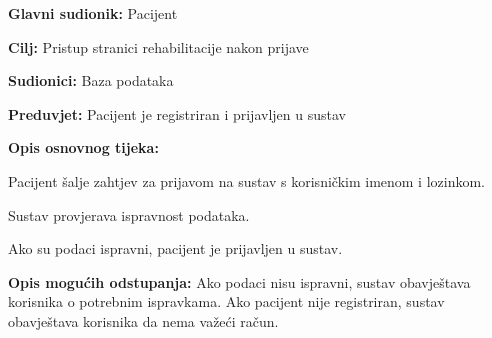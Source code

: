                     \noindent {}
					\begin{packed_item}
	
						\item \textbf{Glavni sudionik: }Pacijent
						\item  \textbf{Cilj:} Pristup stranici rehabilitacije nakon prijave
						\item  \textbf{Sudionici:} Baza podataka
						\item  \textbf{Preduvjet:} Pacijent je registriran i prijavljen u sustav
						\item  \textbf{Opis osnovnog tijeka:}
						
						\item[] \begin{packed_enum}
	
							\item Pacijent šalje zahtjev za prijavom na sustav s korisničkim imenom i lozinkom.
							\item Sustav provjerava ispravnost podataka.
							\item Ako su podaci ispravni, pacijent je prijavljen u sustav.
	
						\end{packed_enum}
						
						\item  \textbf{Opis mogućih odstupanja:} Ako podaci nisu ispravni, sustav obavještava korisnika o potrebnim ispravkama. Ako pacijent nije registriran, sustav obavještava korisnika da nema važeći račun. 
						
						
					\end{packed_item}

